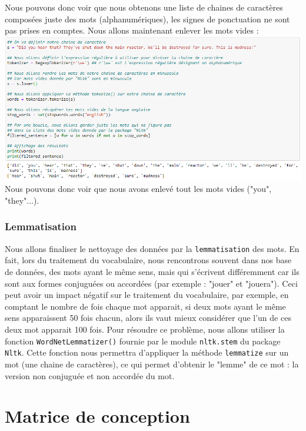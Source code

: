 \documentclass[12pt,a4paper,openany]{article}
\theoremstyle{break}
\newtheorem *{app}{ Application}[section]
\newtheorem *{prf}{ Preuve:}
\begin{document}
Nous pouvons donc voir que nous obtenons une liste de chaines de caractères composées juste des mots (alphanumériques), les signes de ponctuation ne sont pas prises en comptes. Nous allons maintenant enlever les mots vides :\\

\includegraphics[scale=0.595]{capture6.PNG}  \\

Nous pouvons donc voir que nous avons enlevé tout les mots vides ("you", "they"...).


\subsubsection{Lemmatisation}

Nous allons finaliser le nettoyage des données par la \texttt{lemmatisation} des mots. En fait, lors du traitement du vocabulaire, nous rencontrons souvent dans nos base de données, des mots ayant le même sens, mais qui s'écrivent différemment car ils sont aux formes conjuguées ou accordées (par exemple : "jouer" et "jouera"). Ceci peut avoir un impact négatif sur le traitement du vocabulaire, par exemple, en comptant le nombre de fois chaque mot apparait, si deux mots ayant le même sens apparaissent 50 fois chacun, alors ils vaut mieux considérer que l'un de ces deux mot apparait 100 fois.
Pour résoudre ce problème, nous allons utiliser la fonction \texttt{WordNetLemmatizer()} fournie par le module \texttt{nltk.stem} du package \texttt{Nltk}. Cette fonction nous permettra d'appliquer la méthode \texttt{lemmatize} sur un mot (une chaine de caractères), ce qui permet d'obtenir le "lemme" de ce mot : la version non conjuguée et non accordée du mot.

\section{Matrice de conception}
\end{document}
